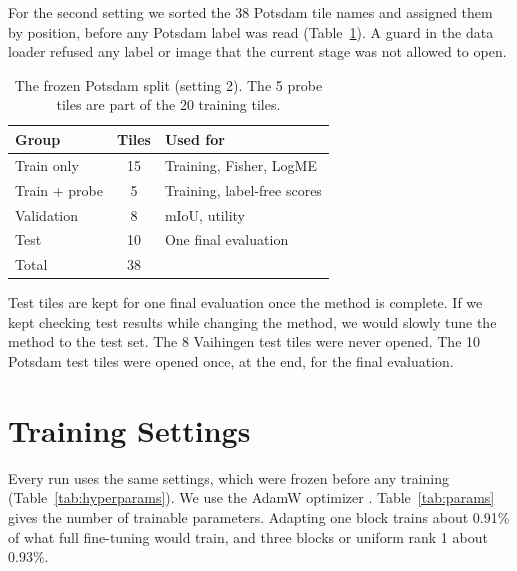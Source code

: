 \documentclass[11pt,a4paper]{report}
\begin{document}
For the second setting we sorted the 38 Potsdam tile names and assigned them by position, before any Potsdam label was read (Table~\ref{tab:splitp}). A guard in the data loader refused any label or image that the current stage was not allowed to open.

\begin{table}[t]
\centering
\caption{The frozen Potsdam split (setting 2). The 5 probe tiles are part of the 20 training tiles.}
\label{tab:splitp}
\small
\begin{tabular}{@{}lcl@{}}
\toprule
\textbf{Group} & \textbf{Tiles} & \textbf{Used for} \\
\midrule
Train only & 15 & Training, Fisher, LogME \\
Train + probe & 5 & Training, label-free scores \\
Validation & 8 & mIoU, utility \\
Test & 10 & One final evaluation \\
\midrule
Total & 38 & \\
\bottomrule
\end{tabular}
\end{table}

Test tiles are kept for one final evaluation once the method is complete. If we kept checking test results while changing the method, we would slowly tune the method to the test set. The 8 Vaihingen test tiles were never opened. The 10 Potsdam test tiles were opened once, at the end, for the final evaluation.

\section{Training Settings}

Every run uses the same settings, which were frozen before any training (Table~\ref{tab:hyperparams}). We use the AdamW optimizer \cite{loshchilov2019decoupled}. Table~\ref{tab:params} gives the number of trainable parameters. Adapting one block trains about 0.91\% of what full fine-tuning would train, and three blocks or uniform rank 1 about 0.93\%.
\end{document}
